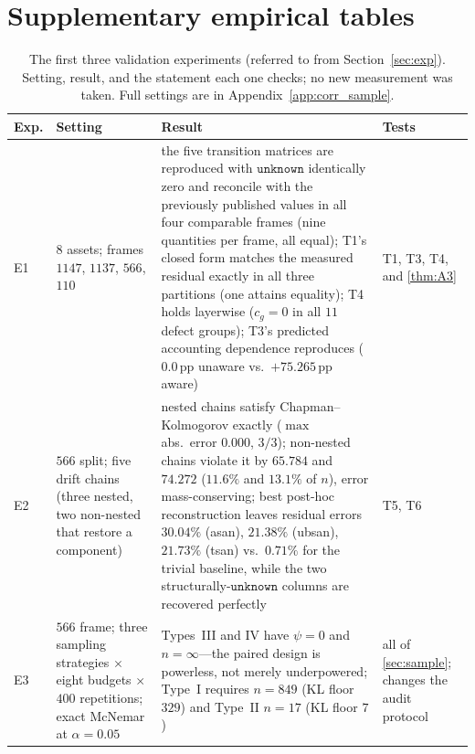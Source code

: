 \documentclass{article}
\newcommand{\unk}{\texttt{unknown}}
\newcommand{\pp}{\,\mathrm{pp}}
\begin{document}
\section{Supplementary empirical tables}
\label{app:extra}

\begin{table}[h]
\centering
\small
\caption{The first three validation experiments (referred to from Section~\ref{sec:exp}). Setting, result,
and the statement each one checks; no new measurement was taken. Full settings are in
Appendix~\ref{app:corr_sample}.}
\label{tab:exp}
\begin{tabular}{@{}p{0.55cm} p{3.5cm} p{6.0cm} p{2.3cm}@{}}
\toprule
Exp. & Setting & Result & Tests \\
\midrule
E1 & $8$ assets; frames $1147$, $1137$, $566$, $110$ & the five transition matrices are reproduced with
$\unk$ identically zero and reconcile with the previously published values in all four comparable frames
(nine quantities per frame, all equal); T1's closed form matches the measured residual exactly in all three
partitions (one attains equality); T4 holds layerwise ($c_g{=}0$ in all $11$ defect groups); T3's predicted
accounting dependence reproduces ($0.0\pp$ unaware vs.\ $+75.265\pp$ aware) & T1, T3, T4, and \ref{thm:A3} \\
E2 & $566$ split; five drift chains (three nested, two non-nested that restore a component) & nested chains
satisfy Chapman--Kolmogorov exactly ($\max$ abs.\ error $0.000$, $3/3$); non-nested chains violate it by
$65.784$ and $74.272$ ($11.6\%$ and $13.1\%$ of $n$), error mass-conserving; best post-hoc reconstruction
leaves residual errors $30.04\%$ (asan), $21.38\%$ (ubsan), $21.73\%$ (tsan) vs.\ $0.71\%$ for the trivial
baseline, while the two structurally-$\unk$ columns are recovered perfectly & T5, T6 \\
E3 & $566$ frame; three sampling strategies $\times$ eight budgets $\times$ $400$ repetitions; exact
McNemar at $\alpha{=}0.05$ & Types~III and IV have $\psi{=}0$ and $n{=}\infty$---the paired design is
powerless, not merely underpowered; Type~I requires $n{=}849$ (KL floor $329$) and Type~II $n{=}17$ (KL
floor $7$) & all of \ref{sec:sample}; changes the audit protocol \\
\bottomrule
\end{tabular}
\end{table}
\end{document}
